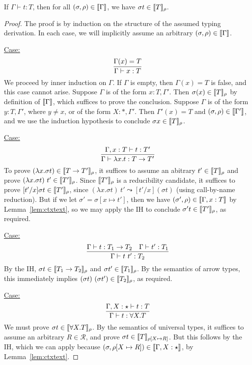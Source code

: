 \documentclass{article}
\begin{document}
\begin{theorem}
If $\Gamma\vdash t : T$, then for all $(\sigma,\rho)\in\llbracket \Gamma \rrbracket$, we have $\sigma t \in\llbracket T \rrbracket_\rho$.
\end{theorem}
\begin{proof}
The proof is by induction on the structure of the assumed typing derivation.
In each case, we will implicitly assume an arbitrary $(\sigma,\rho)\in\llbracket \Gamma \rrbracket$.

\underline{Case:}
\[
\infer{\Gamma \vdash x : T}{\Gamma(x) = T}
\]
We proceed by inner induction on $\Gamma$.  If $\Gamma$ is empty, then
$\Gamma(x) = T$ is false, and this case cannot arise.  Suppose
$\Gamma$ is of the form $x:T, \Gamma'$.  Then
$\sigma(x)\in\llbracket T \rrbracket_\rho$ by definition of $\llbracket \Gamma \rrbracket$,
which suffices to prove the conclusion.  Suppose $\Gamma$ is of the
form $y:T, \Gamma'$, where $y\neq x$, or of the form $X:*,\Gamma'$.
Then $\Gamma'(x) = T$ and $(\sigma,\rho)\in\llbracket \Gamma' \rrbracket$, and we
use the induction hypothesis to conclude $\sigma x\in\llbracket T \rrbracket_\rho$.

\underline{Case:}
\[
\infer{\Gamma \vdash \lambda x . t : T \to T'}{\Gamma, x : T \vdash t : T'} 
\]
To prove $(\lambda x.\sigma t) \in \llbracket T\to T' \rrbracket_\rho$, it suffices
to assume an abitrary $t'\in\llbracket T \rrbracket_\rho$ and prove $(\lambda
x.\sigma t)\ t'\in\llbracket T' \rrbracket_\rho$.  Since $\llbracket T' \rrbracket_\rho$ is a
reducibility candidate, it suffices to prove $[t'/x]\sigma
t\in\llbracket T' \rrbracket_\rho$, since $(\lambda x.\sigma t)\ t' \leadsto
[t'/x](\sigma t)$ (using call-by-name reduction).  But if we let $\sigma'=\sigma[x\mapsto t']$, then
we have $(\sigma',\rho)\in\llbracket \Gamma,x:T \rrbracket$ by
Lemma~\ref{lem:ctxtext}, so we may apply the IH to conclude $\sigma'
t\in\llbracket T' \rrbracket_\rho$, as required.

\underline{Case:}
\[
\infer{\Gamma \vdash t\ t' : T_2}{\Gamma \vdash t : T_1 \to T_2 & \Gamma \vdash t' : T_1} 
\]
By the IH, $\sigma t\in\llbracket T_1 \to T_2 \rrbracket_\rho$ and $\sigma
t'\in\llbracket T_1 \rrbracket_\rho$.  By the semantics of arrow types, this
immediately implies $(\sigma t)\ (\sigma t')\in\llbracket T_2 \rrbracket_\rho$, as
required.

\underline{Case:}
\[
\infer{\Gamma \vdash t : \forall X.T}{\Gamma,X : \star \vdash t : T} 
\]
We must prove $\sigma t\in\llbracket \forall X.T \rrbracket_\rho$.  By the
semantics of universal types, it suffices to assume an arbitrary
$R\in\mathcal{R}$, and prove $\sigma t\in\llbracket T \rrbracket_{\rho[X\mapsto
  R]}$.  But this follows by the IH, which we can apply because
$(\sigma,\rho[X\mapsto R])\in\llbracket \Gamma, X:\star \rrbracket$, by
Lemma~\ref{lem:ctxtext}.


\end{proof}
\end{document}
